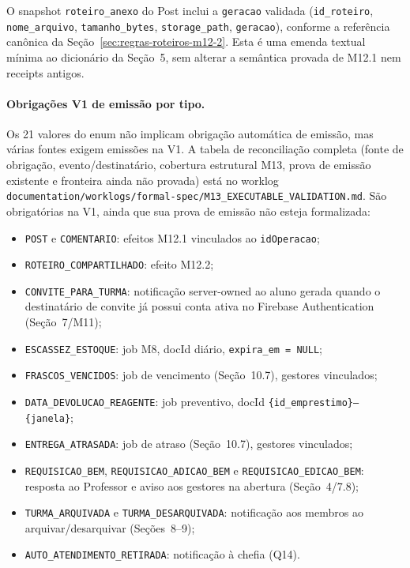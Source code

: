 \begin{regra}
O snapshot \texttt{roteiro\_anexo} do Post inclui a \texttt{geracao} validada
(\texttt{id\_roteiro}, \texttt{nome\_arquivo}, \texttt{tamanho\_bytes},
\texttt{storage\_path}, \texttt{geracao}), conforme a referência canônica da
Seção~\ref{sec:regras-roteiros-m12-2}. Esta é uma emenda textual mínima ao
dicionário da Seção~5, sem alterar a semântica provada de M12.1 nem receipts
antigos.
\end{regra}

\paragraph{Obrigações V1 de emissão por tipo.}
Os 21 valores do enum não implicam obrigação automática de emissão, mas várias
fontes exigem emissões na V1. A tabela de reconciliação completa (fonte de
obrigação, evento/destinatário, cobertura estrutural M13, prova de emissão
existente e fronteira ainda não provada) está no worklog
\texttt{documentation/worklogs/formal-spec/M13\_EXECUTABLE\_VALIDATION.md}. São
obrigatórias na V1, ainda que sua prova de emissão não esteja formalizada:
\begin{itemize}
  \item \texttt{POST} e \texttt{COMENTARIO}: efeitos M12.1 vinculados ao \texttt{idOperacao};
  \item \texttt{ROTEIRO\_COMPARTILHADO}: efeito M12.2;
  \item \texttt{CONVITE\_PARA\_TURMA}: notificação server-owned ao aluno gerada quando o destinatário de convite já possui conta ativa no Firebase Authentication (Seção~7/M11);
  \item \texttt{ESCASSEZ\_ESTOQUE}: job M8, docId diário, \texttt{expira\_em = NULL};
  \item \texttt{FRASCOS\_VENCIDOS}: job de vencimento (Seção~10.7), gestores vinculados;
  \item \texttt{DATA\_DEVOLUCAO\_REAGENTE}: job preventivo, docId \texttt{\{id\_emprestimo\}--\{janela\}};
  \item \texttt{ENTREGA\_ATRASADA}: job de atraso (Seção~10.7), gestores vinculados;
  \item \texttt{REQUISICAO\_BEM}, \texttt{REQUISICAO\_ADICAO\_BEM} e \texttt{REQUISICAO\_EDICAO\_BEM}: resposta ao Professor e aviso aos gestores na abertura (Seção~4/7.8);
  \item \texttt{TURMA\_ARQUIVADA} e \texttt{TURMA\_DESARQUIVADA}: notificação aos membros ao arquivar/desarquivar (Seções~8--9);
  \item \texttt{AUTO\_ATENDIMENTO\_RETIRADA}: notificação à chefia (Q14).
\end{itemize}
